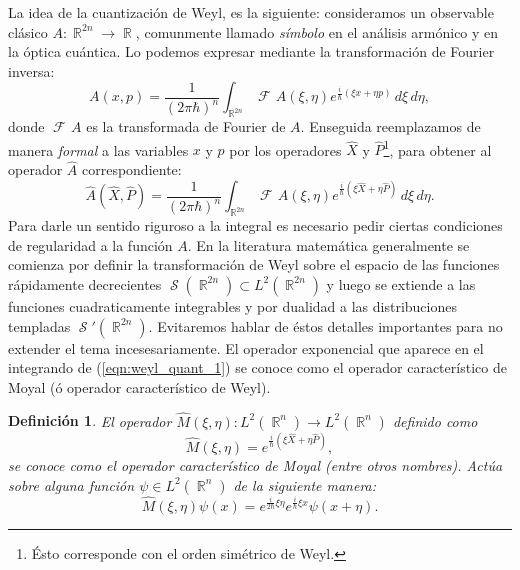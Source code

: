 \documentclass[a4paper]{report}
\DeclareMathOperator{\R}{\mathbb{R}}
\DeclareMathOperator{\Sz}{\mathcal S}
\DeclareMathOperator{\Fr}{\mathcal{F}\!}
\newtheorem{definition}{Definición}
\begin{document}
  La idea de la cuantización de Weyl, es la siguiente:
  consideramos un observable clásico $A : \R^{2n} \to \R$,
  comunmente llamado \textit{símbolo} en el análisis
  armónico y en la óptica cuántica. Lo podemos expresar
  mediante la transformación de Fourier inversa:
  \begin{equation}
    A(x,p)
    = \frac{1}{(2\pi\hbar)^{n}} \int_{\R^{2n}} \Fr A(\xi,
    \eta) e^{\frac{i}{\hbar} \left( \xi x + \eta p\right) }
    \, d\xi \, d\eta,
  \end{equation}
  donde $\Fr A$ es la transformada de Fourier de $A$.
  Enseguida reemplazamos de manera \textit{formal} a las
  variables $x$ y $p$ por los operadores $\hat{X}$ y
  $\hat{P}$\footnote{Ésto corresponde con el orden simétrico
    de Weyl.}, para obtener al operador $\hat{A}$
  correspondiente:
  \begin{equation}
    \label{eqn:weyl_quant_1}
    \hat{A}(\hat{X},\hat{P})
    = \frac{1}{(2\pi\hbar)^{n}} \int_{\R^{2n}} \Fr
    A(\xi,\eta) e^{\frac{i}{\hbar} \left( \xi \hat{X} + \eta
    \hat{P}\right) } \, d\xi \, d\eta.
  \end{equation}
  Para darle un sentido riguroso a la integral es necesario
  pedir ciertas condiciones de regularidad a la función $A$.
  En la literatura matemática generalmente se comienza por
  definir la transformación de Weyl sobre el espacio de las
  funciones rápidamente decrecientes $\Sz(\R^{2n}) \subset
  L^2(\R^{2n})$ y luego se extiende a las funciones
  cuadraticamente integrables y por dualidad a las
  distribuciones templadas $\Sz'(\R^{2n})$. Evitaremos
  hablar de éstos detalles importantes para no extender el
  tema incesesariamente. El operador exponencial que
  aparece en el integrando de (\ref{eqn:weyl_quant_1}) se
  conoce como el operador característico de Moyal (ó
  operador característico de Weyl).
  \begin{definition}
    El operador $\hat{M}(\xi, \eta) : L^2(\R^{n}) \to
    L^2(\R^{n})$ definido como
    \begin{equation*}
      \hat{M}(\xi,\eta)
      = e^{\frac{i}{\hbar} \left( \xi \hat{X} + \eta \hat{P}
      \right) },
    \end{equation*} 
    se conoce como el operador característico de Moyal
    (entre otros nombres). Actúa sobre alguna función $\psi
    \in L^2(\R^{n})$ de la siguiente manera:
    \begin{equation}
      \hat{M}(\xi,\eta)\psi(x)
      = e^{\frac{i}{2\hbar} \xi\eta} e^{\frac{i}{\hbar} \xi
      x} \psi(x + \eta).
    \end{equation}
  \end{definition}
\end{document}
